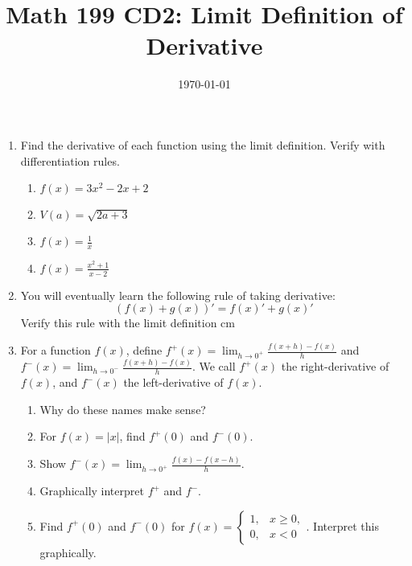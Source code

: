 \documentclass[12pt]{article}
\title{Math 199 CD2:  Limit Definition of Derivative}
\date{\today}
\newcommand{\D}{\displaystyle}
\begin{document}
	
	\maketitle
\begin{enumerate}
	\item Find the derivative of each function using the limit definition.  Verify with differentiation rules.
	\begin{enumerate}
		\item $f(x)=3x^2-2x+2$ \vskip 3cm
		\item $V(a)=\sqrt{2a+3}$\vskip 3cm
		\item $\D f(x)=\frac{1}{x}$\vskip 3cm
		\item $\D f(x)=\frac{x^2+1}{x-2}$\vskip 3cm
	\end{enumerate}

	\item You will eventually learn the following rule of taking derivative:
	$$(f(x)+g(x))'=f(x)'+g(x)'$$
	Verify this rule with the limit definition
	 cm
	
	
	
	\item For a function $f(x)$, define $f^+(x) = \lim_{h\to 0^+} \frac{f(x+h)-f(x)}{h}$ and $f^-(x) = \lim_{h\to 0^-} \frac{f(x+h)-f(x)}{h}$. We call $f^+(x)$ the right-derivative of $f(x)$, and $f^-(x)$ the left-derivative of $f(x)$.
	
	\begin{enumerate}
		
		\item Why do these names make sense?
		
		\vskip 2cm
		\item For $f(x) = |x|$, find $f^+(0)$ and $f^-(0)$.
		
		\vskip2cm 
		
		\item Show $f^-(x) = \lim_{h\to 0^+} \frac{f(x)-f(x-h)}{h}$.
		
		\vskip 2cm
		
		\item Graphically interpret $f^+$ and $f^-$.
		\vskip 2cm
		
		\item Find $f^+(0)$ and $f^-(0)$ for $f(x) = \begin{cases} 1, & x \geq 0, \\ 0, & x<0 \end{cases}$. Interpret this graphically.
		
		\vskip 4cm
		

\end{enumerate}
\end{enumerate}
\end{document}
